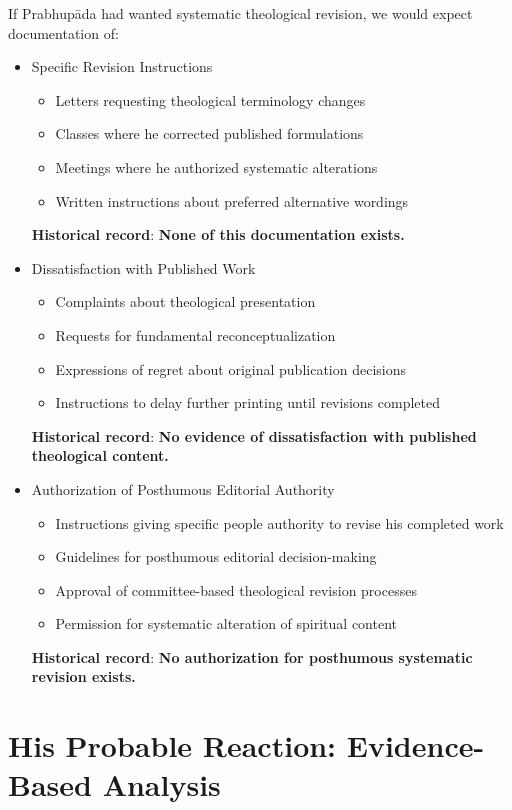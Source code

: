\documentclass[11pt,twoside]{book}
\begin{document}
If Prabhupāda had wanted systematic theological revision, we would expect documentation of:
\begin{itemize}
\item Specific Revision Instructions
\label{sec:org04c3477}
\begin{itemize}
\item Letters requesting theological terminology changes
\item Classes where he corrected published formulations
\item Meetings where he authorized systematic alterations
\item Written instructions about preferred alternative wordings
\end{itemize}

\textbf{\textbf{Historical record}}: \textbf{\textbf{None of this documentation exists.}}
\item Dissatisfaction with Published Work
\label{sec:orgbe02bbc}
\begin{itemize}
\item Complaints about theological presentation
\item Requests for fundamental reconceptualization
\item Expressions of regret about original publication decisions
\item Instructions to delay further printing until revisions completed
\end{itemize}

\textbf{\textbf{Historical record}}: \textbf{\textbf{No evidence of dissatisfaction with published theological content.}}
\item Authorization of Posthumous Editorial Authority
\label{sec:orgd1248ac}
\begin{itemize}
\item Instructions giving specific people authority to revise his completed work
\item Guidelines for posthumous editorial decision-making
\item Approval of committee-based theological revision processes
\item Permission for systematic alteration of spiritual content
\end{itemize}

\textbf{\textbf{Historical record}}: \textbf{\textbf{No authorization for posthumous systematic revision exists.}}
\end{itemize}
\section*{His Probable Reaction: Evidence-Based Analysis}
\label{sec:orgb07469e}
\end{document}
